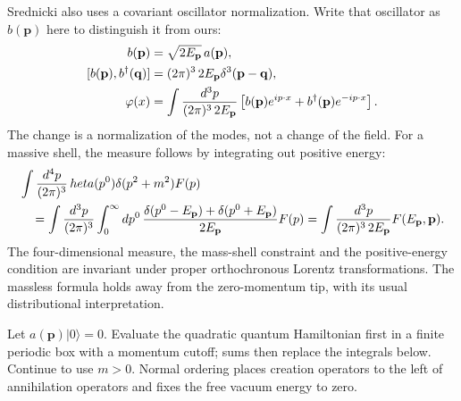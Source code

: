 Srednicki also uses a covariant oscillator normalization. Write that
oscillator as $b(\mathbf p)$ here to distinguish it from ours:
\begin{align}
 b(\mathbf p)&=\sqrt{2E_{\mathbf p}}\,a(\mathbf p),\notag\\
 [b(\mathbf p),b^\dagger(\mathbf q)]
 &=(2\pi)^3\,2E_{\mathbf p}\delta^3(\mathbf p-\mathbf q),\notag\\
 \varphi(x)&=\int\frac{d^3p}{(2\pi)^3\,2E_{\mathbf p}}
 \left[b(\mathbf p)e^{ip\cdot x}
       +b^\dagger(\mathbf p)e^{-ip\cdot x}\right].
 \label{qft:covariant-normalization}
\end{align}
The change is a normalization of the modes, not a change of the field.
For a massive shell, the measure follows by integrating out positive energy:
\begin{align}
 &\int\frac{d^4p}{(2\pi)^3}\,	heta(p^0)\delta(p^2+m^2)F(p)
 \notag\\
 &\quad=\int\frac{d^3p}{(2\pi)^3}
 \int_0^\infty dp^0\,
 \frac{\delta(p^0-E_{\mathbf p})+\delta(p^0+E_{\mathbf p})}
 {2E_{\mathbf p}}F(p)
 =\int\frac{d^3p}{(2\pi)^3\,2E_{\mathbf p}}
 F(E_{\mathbf p},\mathbf p).
 \label{qft:invariant-shell-measure}
\end{align}
The four-dimensional measure, the mass-shell constraint and the positive-energy
condition are invariant under proper orthochronous Lorentz transformations.
The massless formula holds away from the zero-momentum tip, with its usual
distributional interpretation.

Let $a(\mathbf p)|0\rangle=0$. Evaluate the quadratic quantum
Hamiltonian first in a finite periodic box with a momentum cutoff; sums
then replace the integrals below. Continue to use $m>0$. Normal ordering
places creation operators to the left of annihilation operators and fixes
the free vacuum energy to zero.

